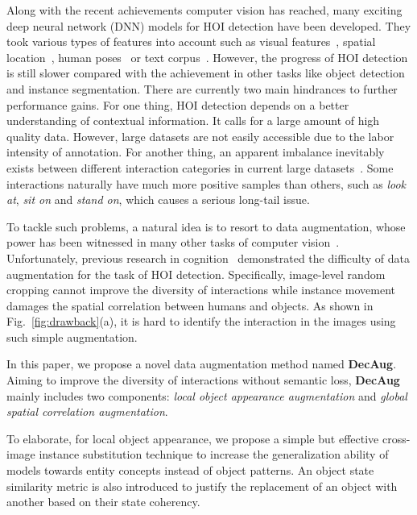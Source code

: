 \documentclass[10pt,twocolumn,letterpaper]{article}
\begin{document}
Along with the recent achievements computer vision has reached, many exciting deep neural network (DNN) models for HOI detection have been developed. They took various types of features into account such as visual features~\cite{gupta2015visual}, spatial location~\cite{chao2018learning,xu2019interact}, human poses~\cite{yao2010modeling,Gkioxari_2018_CVPR} or text corpus~\cite{liang2020visual}. However, the progress of HOI detection is still slower compared with the achievement in other tasks like object detection and instance segmentation. There are currently two main hindrances to further performance gains. For one thing, HOI detection depends on a better understanding of contextual information. It calls for a large amount of high quality data. However, large datasets are not easily accessible due to the labor intensity of annotation. For another thing, an apparent imbalance inevitably exists between different interaction categories in current large datasets~\cite{gupta2015visual,chao2018learning,zhuang2017care}. Some interactions naturally have much more positive samples than others, such as \textit{look at}, \textit{sit on} and \textit{stand on}, which causes a serious long-tail issue.


To tackle such problems, a natural idea is to resort to data augmentation, whose power has been witnessed in many other tasks of computer vision~\cite{cubuk2019randaugment,simard2003best,hinterstoisser2019annotation,liu2016ssd,peng2018jointly,jaderberg2015spatial,fang2019instaboost}.
Unfortunately, previous research in cognition~\cite{baldassano2017human} demonstrated the difficulty of data augmentation for the task of HOI detection. Specifically, image-level random cropping cannot improve the diversity of interactions while instance movement damages the spatial correlation between humans and objects. As shown in Fig.~\ref{fig:drawback}(a), it is hard to identify the interaction in the images using such simple augmentation.




In this paper, we propose a novel data augmentation method named \textbf{DecAug}. Aiming to improve the diversity of interactions without semantic loss, \textbf{DecAug} mainly includes two components: \textit{local object appearance augmentation} and \textit{global spatial correlation augmentation}.

To elaborate, for local object appearance, we propose a simple but effective cross-image instance substitution technique to increase the generalization ability of models towards entity concepts instead of object patterns. An object state similarity metric is also introduced to justify the replacement of an object with another based on their state coherency.
\end{document}
